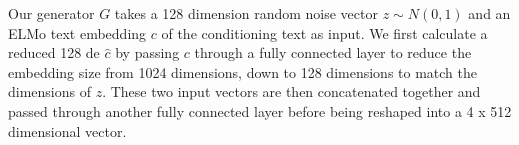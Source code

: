 Our generator $G$ takes a 128 dimension random noise vector $z \sim N(0, 1)$ and an ELMo text embedding $c$ of the conditioning text as input. We first calculate a reduced 128 de $\hat{c}$ by passing $c$ through a fully connected layer to reduce the embedding size from 1024 dimensions, down to 128 dimensions to match the dimensions of $z$. These two input vectors are then concatenated together and passed through another fully connected layer before being reshaped into a 4 x 512 dimensional vector.